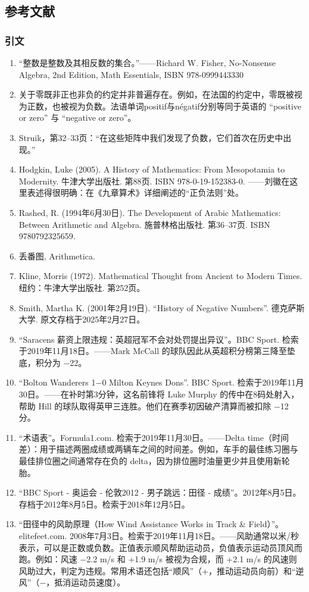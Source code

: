 \subsection{参考文献}
\subsubsection{引文}
\begin{enumerate}
\item “整数是整数及其相反数的集合。”——Richard W. Fisher, No-Nonsense Algebra, 2nd Edition, Math Essentials, ISBN 978-0999443330
\item 关于零既非正也非负的约定并非普遍存在。例如，在法国的约定中，零既被视为正数，也被视为负数。法语单词positif与négatif分别等同于英语的 “positive or zero” 与 “negative or zero”。
\item Struik，第32–33页：“在这些矩阵中我们发现了负数，它们首次在历史中出现。”
\item Hodgkin, Luke (2005). A History of Mathematics: From Mesopotamia to Modernity. 牛津大学出版社. 第88页. ISBN 978-0-19-152383-0. ——刘徽在这里表述得很明确：在《九章算术》详细阐述的“正负法则”处。
\item Rashed, R. (1994年6月30日). The Development of Arabic Mathematics: Between Arithmetic and Algebra. 施普林格出版社. 第36–37页. ISBN 9780792325659.
\item 丢番图, Arithmetica.
\item Kline, Morris (1972). Mathematical Thought from Ancient to Modern Times. 纽约：牛津大学出版社. 第252页。
\item Smith, Martha K. (2001年2月19日). “History of Negative Numbers”. 德克萨斯大学. 原文存档于2025年2月27日。
\item “Saracens 薪资上限违规：英超冠军不会对处罚提出异议”。BBC Sport. 检索于2019年11月18日。——Mark McCall 的球队因此从英超积分榜第三降至垫底，积分为 −22。
\item “Bolton Wanderers 1−0 Milton Keynes Dons”. BBC Sport. 检索于2019年11月30日。——在补时第3分钟，这名前锋将 Luke Murphy 的传中在8码处射入，帮助 Hill 的球队取得英甲三连胜。他们在赛季初因破产清算而被扣除 −12 分。
\item “术语表”。Formula1.com. 检索于2019年11月30日。——Delta time（时间差）：用于描述两圈成绩或两辆车之间的时间差。例如，车手的最佳练习圈与最佳排位圈之间通常存在负的 delta，因为排位圈时油量更少并且使用新轮胎。
\item “BBC Sport - 奥运会 - 伦敦2012 - 男子跳远：田径 - 成绩”。2012年8月5日。存档于2012年8月5日。检索于2018年12月5日。
\item  “田径中的风助原理（How Wind Assistance Works in Track & Field）”。elitefeet.com. 2008年7月3日。检索于2019年11月18日。——风助通常以米/秒表示，可以是正数或负数。正值表示顺风帮助运动员，负值表示运动员顶风而跑。例如：风速 −2.2 m/s 和 +1.9 m/s 被视为合规，而 +2.1 m/s 的风速则风助过大，判定为违规。常用术语还包括“顺风”（+，推动运动员向前）和“逆风”（−，抵消运动员速度）。

\end{enumerate}
